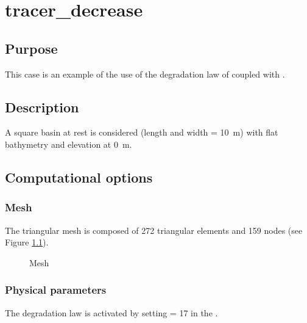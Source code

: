 \chapter{tracer\_decrease}

\section{Purpose}

This case is an example of the use of the degradation law of \waqtel coupled with .

\section{Description}

A square basin at rest is considered (length and width = 10~m)
with flat bathymetry and elevation at 0~m.

\section{Computational options}

\subsection{Mesh}

The triangular mesh is composed of 272 triangular elements and 159 nodes
(see Figure \ref{fig:tracer_decrease:mesh}).

\begin{figure}[H]
 \centering
\caption{Mesh}
 \label{fig:tracer_decrease:mesh}
\end{figure}

\subsection{Physical parameters}

The degradation law is activated by setting  = 17
in the  .\\

